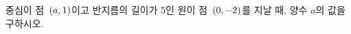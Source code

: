 중심이 점~$(a{,}\mkern3mu\mathopen{}1)$이고 반지름의 길이가 $5$인 원이 점~$(0{,}\mkern3mu\mathopen{}-2)$를 지날 때, 양수 $a$의 값을 구하시오.
